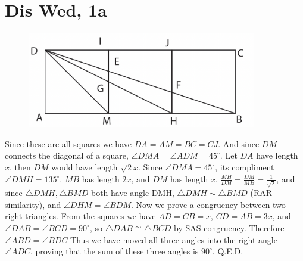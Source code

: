 \documentclass[12pt]{article}
\newcommand{\degrees}{^{\circ}}
\begin{document}
\section{Dis Wed, 1a}
\begin{figure}[h]
    \includegraphics[width = 100mm]{GRAPH7.png}
\end{figure}
Since these are all squares we have $DA = AM = BC = CJ$. And since $DM$ connects the diagonal of a square, $\angle DMA = \angle ADM = 45 \degrees$.
\newline
Let $DA$ have length $x$, then $DM$ would have length $\sqrt 2 x$. Since $\angle DMA = 45 \degrees$, its compliment $\angle DMH = 135 \degrees$. $MB$ has length $2x$, and $DM$ has length $x$.
\newline
$\frac{MH}{DM} = \frac{DM}{MB} = \frac{1}{\sqrt2}$, and since $\triangle DMH, \triangle BMD$ both have angle DMH, $\triangle DMH \sim \triangle BMD$ (RAR similarity), and $\angle DHM = \angle BDM$.
\newline
Now we prove a congruency between two right triangles. From the squares we have $AD = CB = x$,  $CD = AB = 3x$, and $\angle DAB = \angle BCD = 90 \degrees$, so $\triangle DAB \cong \triangle BCD$ by SAS congruency. Therefore $\angle ABD = \angle BDC$
\newline
Thus we have moved all three angles into the right angle $\angle ADC$, proving that the sum of these three angles is $90 \degrees$. Q.E.D.
\newpage
\end{document}
